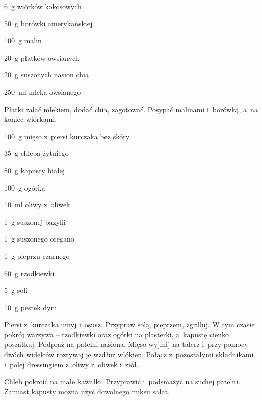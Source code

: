 \documentclass[../main.tex]{subfiles}
\begin{document}

\begin{Ingred}
    \item \qty{6}{\gram} wiórków kokosowych
    \item \qty{50}{\gram} borówki amerykańskiej
    \item \qty{100}{\gram} malin
    \item \qty{20}{\gram} płatków owsianych
    \item \qty{20}{\gram} suszonych nasion chia
    \item \qty{250}{\milli\litre} mleka owsianego
\end{Ingred}

Płatki zalać mlekiem, dodać chia, zagotować. Posypać malinami i~borówką, a~na
koniec wiórkami.


\begin{Ingred}
    \item \qty{100}{\gram} mięso z~piersi kurczaka bez skóry
    \item \qty{35}{\gram} chleba żytniego
    \item \qty{80}{\gram} kapusty białej
    \item \qty{100}{\gram} ogórka
    \item \qty{10}{\milli\litre} oliwy z~oliwek
    \item \qty{1}{\gram} suszonej bazylii
    \item \qty{1}{\gram} suszonego oregano
    \item \qty{1}{\gram} pieprzu czarnego
    \item \qty{60}{\gram} rzodkiewki
    \item \qty{5}{\gram} soli
    \item \qty{10}{\gram} pestek dyni
\end{Ingred}

Piersi z~kurczaka umyj i~osusz. Przypraw solą, pieprzem, zgrilluj. W tym czasie
pokrój warzywa -- rzodkiewki oraz ogórki na plasterki, a~kapustę cienko
poszatkuj. Podpraż na patelni nasiona. Mięso wyjmij na talerz i~przy pomocy
dwóch widelców rozrywaj je wzdłuż włókien. Połącz z~pozostałymi składnikami
i~polej dressingiem z~oliwy z~oliwek i~ziół.

Chleb pokroić na małe kawałki. Przyprawić i~podsmażyć na suchej patelni.
Zamiast kapusty można użyć dowolnego miksu sałat.

\end{document}
